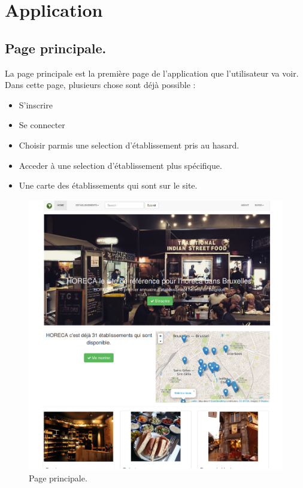 \documentclass[a4paper,10pt]{article}
\begin{document}
\section{Application}
\subsection{Page principale.}
La page principale est la première page de l'application que l'utilisateur va
voir. Dans cette page, plusieurs chose sont déjà possible :

\begin{itemize}
    \item S'inscrire
    \item Se connecter
    \item Choisir parmis une selection d'établissement pris au hasard.
    \item Acceder à une selection d'établissement plus spécifique.
    \item Une carte des établissements qui sont sur le site.
\end{itemize}

\begin{figure}[h]
  \centering
  \includegraphics[scale=0.2]{./images/main.png}
  \caption{Page principale.}
\end{figure}
\end{document}
